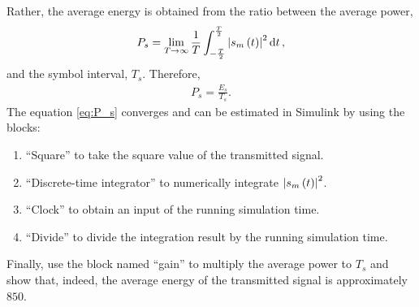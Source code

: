 \documentclass[12pt,a4paper]{article}
\begin{document}
Rather, the average energy is obtained from the ratio between the average power,
\begin{align}
    \label{eq:P_s}
    P_s = \lim_{T \rightarrow \infty} \frac{1}{T} \int_{-\frac{T}{2}}^{\frac{T}{2}} \abs{s_m \left( t \right)}^{2} \dd{t},
\end{align}
and the symbol interval, \(T_s\). Therefore,
\begin{align}
    P_s = \frac{E_s}{T_s}.
\end{align}
The equation \eqref{eq:P_s} converges and can be estimated in Simulink by using the blocks:
\begin{enumerate}
    \item ``Square'' to take the square value of the transmitted signal.
    \item ``Discrete-time integrator'' to numerically integrate \(\abs{s_m \left( t \right)}^{2}\).
    \item ``Clock'' to obtain an input of the running simulation time.
    \item ``Divide'' to divide the integration result by the running simulation time.
\end{enumerate}

Finally, use the block named ``gain'' to multiply the average power to \(T_s\) and show that, indeed, the average energy of the transmitted signal is approximately \(850\).

\printbibliography
\end{document}

